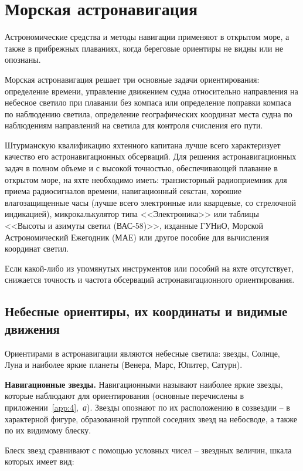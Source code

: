 \chapter{Морская астронавигация}

Астрономические средства и методы навигации применяют в открытом море, а также в прибрежных плаваниях, когда береговые ориентиры не видны или не опознаны.

Морская астронавигация решает три основные задачи ориентирования: определение времени, управление движением судна относительно направления на небесное светило при плавании без компаса или определение поправки компаса по наблюдению светила, определение географических координат места судна по наблюдениям направлений на светила для контроля счисления его пути.

Штурманскую квалификацию яхтенного капитана лучше всего характеризует качество его астронавигационных обсерваций. Для решения астронавигационных задач в полном объеме и с высокой точностью, обеспечивающей плавание в открытом море, на яхте необходимо иметь: транзисторный радиоприемник для приема радиосигналов времени, навигационный секстан, хорошие влагозащищенные часы (лучше всего электронные или кварцевые, со стрелочной индикацией), микрокалькулятор типа <<Электроника>> или таблицы <<Высоты и азимуты светил (ВАС-58)>>, изданные ГУНиО, Морской Астрономический Ежегодник (МАЕ) или другое пособие для вычисления координат светил.

Если какой-либо из упомянутых инструментов или пособий на яхте отсутствует, снижается точность и частота обсерваций астронавигационного ориентирования.

\section{Небесные ориентиры, их координаты и видимые движения}
\label{sec:7-1}

Ориентирами в астронавигации являются небесные светила: звезды, Солнце, Луна и наиболее яркие планеты (Венера, Марс, Юпитер, Сатурн).

\textbf{Навигационные звезды.} Навигационными называют наиболее яркие звезды, которые наблюдают для ориентирования (основные перечислены в приложении~\ref{app:4},~\textit{а}). Звезды опознают по их расположению в созвездии \--- в характерной фигуре, образованной группой соседних звезд на небосводе, а также по их видимому блеску.

Блеск звезд сравнивают с помощью условных чисел \--- звездных величин, шкала которых имеет вид:

